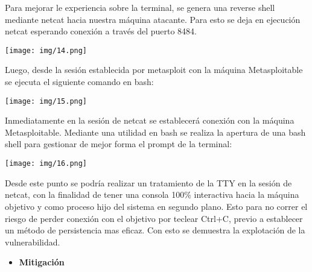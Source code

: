 \documentclass[12pt,oneside,a4paper]{book}
\begin{document}
\begin{enumerate}
\hspace{20pt}
Para mejorar le experiencia sobre la terminal, se genera una reverse shell mediante netcat hacia nuestra máquina atacante. Para esto se deja en ejecución netcat esperando conexión a través del puerto 8484.

\vspace{1em}

\begin{center}
    \texttt{[image: img/14.png]}
\end{center}

\vspace{1em}

\hspace{20pt}
Luego, desde la sesión establecida por metasploit con la máquina Metasploitable se ejecuta el siguiente comando en bash:

\vspace{1em}

\begin{center}
    \texttt{[image: img/15.png]}
\end{center}

\vspace{1em}

\hspace{20pt}
Inmediatamente en la sesión de netcat se establecerá conexión con la máquina Metasploitable. Mediante una utilidad en bash se realiza la apertura de una bash shell para gestionar de mejor forma el prompt de la terminal:

\vspace{1em}

\begin{center}
    \texttt{[image: img/16.png]}
\end{center}

\vspace{1em}

\hspace{20pt}
Desde este punto se podría realizar un tratamiento de la TTY en la sesión de netcat, con la finalidad de tener una consola 100\% interactiva hacia la máquina objetivo y como proceso hijo del sistema en segundo plano. Esto para no correr el riesgo de perder conexión con el objetivo por teclear Ctrl+C, previo a establecer un método de persistencia mas eficaz. Con esto se demuestra la explotación de la vulnerabilidad.

\vspace{2em}

\begin{itemize}
	\item 	\textbf{Mitigación}


\end{itemize}
\end{enumerate}
\end{document}
